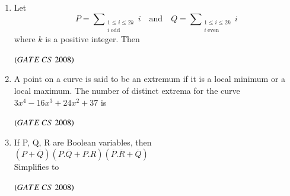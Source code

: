 \documentclass[journal]{IEEEtran}
\numberwithin{equation}{enumi}
\numberwithin{figure}{enumi}
\begin{document}
\begin{enumerate}
\item Let \[ P = \sum\nolimits_{\substack{1 \le i \le 2k \\ i\ \text{odd}}} i \quad\text{and}\quad Q = \sum\nolimits_{\substack{1 \le i \le 2k \\ i\ \text{even}}} i \]where \(k\) is a positive integer. Then 
\begin{enumerate}
\end{enumerate}
\hfill $\left(GATE\ CS\  2008\right)$

\item A point on a curve is said to be an extremum if it is a local minimum or a local maximum. The number of distinct extrema for the curve $3x^4-16x^3+24x^2+37$ is 
\begin{enumerate}
\end{enumerate}
\hfill $\left(GATE\ CS\  2008\right)$

\item If P, Q, R are Boolean variables, then \\
$(P+\overline{Q})(P.\overline{Q}+P.R)(\overline{P}.\overline{R}+\overline{Q})$\\
Simplifies  to
\begin{enumerate}
\end{enumerate}
\hfill $\left(GATE\ CS\  2008\right)$


\end{enumerate}
\end{document}
